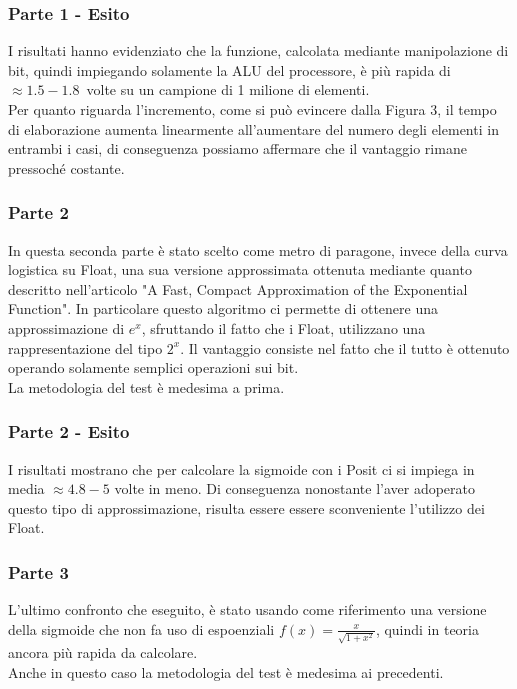 \documentclass[a4paper,11pt]{article}
\begin{document}
\subsubsection{Parte 1 - Esito}


I risultati hanno evidenziato che la funzione, calcolata mediante manipolazione di bit, quindi impiegando solamente la ALU del processore, è più rapida di $\approx1.5-1.8$\ volte su un campione di 1 milione di elementi. \\
Per quanto riguarda l'incremento, come si può evincere dalla Figura 3, il tempo di elaborazione aumenta linearmente all'aumentare del numero degli elementi in entrambi i casi, di conseguenza possiamo affermare che il vantaggio rimane pressoché costante.

 
\subsubsection{Parte 2}

In questa seconda parte è stato scelto come metro di paragone, invece della curva logistica su Float, una sua versione approssimata ottenuta mediante quanto descritto nell'articolo "A Fast, Compact Approximation of the Exponential Function"\cite{afast}. In particolare questo algoritmo ci permette di ottenere una approssimazione di $e^{x}$, sfruttando il fatto che i Float, utilizzano una rappresentazione del tipo $2^x$. Il vantaggio consiste nel fatto che il tutto è ottenuto operando solamente semplici operazioni sui bit.\\
La metodologia del test è medesima a prima.
\subsubsection{Parte 2 - Esito}

I risultati mostrano che per calcolare la sigmoide con i Posit ci si impiega in media $\approx4.8-5$ volte in meno. Di conseguenza nonostante l'aver adoperato questo tipo di approssimazione, risulta essere essere sconveniente l'utilizzo dei Float.

\subsubsection{Parte 3}
L'ultimo confronto che eseguito, è stato usando come riferimento una versione della sigmoide che non fa uso di espoenziali $f(x) = \frac{x}{\sqrt{1+x^{2}}}$, quindi in teoria ancora più rapida da calcolare.\\
Anche in questo caso la metodologia del test è medesima ai precedenti.
\end{document}
